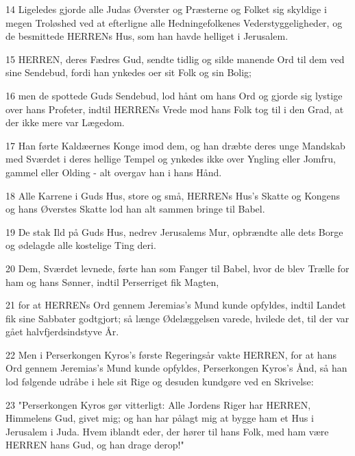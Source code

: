 \par 14 Ligeledes gjorde alle Judas Øverster og Præsterne og Folket sig skyldige i megen Troløshed ved at efterligne alle Hedningefolkenes Vederstyggeligheder, og de besmittede HERRENs Hus, som han havde helliget i Jerusalem.
\par 15 HERREN, deres Fædres Gud, sendte tidlig og silde manende Ord til dem ved sine Sendebud, fordi han ynkedes oer sit Folk og sin Bolig;
\par 16 men de spottede Guds Sendebud, lod hånt om hans Ord og gjorde sig lystige over hans Profeter, indtil HERRENs Vrede mod hans Folk tog til i den Grad, at der ikke mere var Lægedom.
\par 17 Han førte Kaldæernes Konge imod dem, og han dræbte deres unge Mandskab med Sværdet i deres hellige Tempel og ynkedes ikke over Yngling eller Jomfru, gammel eller Olding - alt overgav han i hans Hånd.
\par 18 Alle Karrene i Guds Hus, store og små, HERRENs Hus's Skatte og Kongens og hans Øverstes Skatte lod han alt sammen bringe til Babel.
\par 19 De stak Ild på Guds Hus, nedrev Jerusalems Mur, opbrændte alle dets Borge og ødelagde alle kostelige Ting deri.
\par 20 Dem, Sværdet levnede, førte han som Fanger til Babel, hvor de blev Trælle for ham og hans Sønner, indtil Perserriget fik Magten,
\par 21 for at HERRENs Ord gennem Jeremias's Mund kunde opfyldes, indtil Landet fik sine Sabbater godtgjort; så længe Ødelæggelsen varede, hvilede det, til der var gået halvfjerdsindstyve År.
\par 22 Men i Perserkongen Kyros's første Regeringsår vakte HERREN, for at hans Ord gennem Jeremias's Mund kunde opfyldes, Perserkongen Kyros's Ånd, så han lod følgende udråbe i hele sit Rige og desuden kundgøre ved en Skrivelse:
\par 23 "Perserkongen Kyros gør vitterligt: Alle Jordens Riger har HERREN, Himmelens Gud, givet mig; og han har pålagt mig at bygge ham et Hus i Jerusalem i Juda. Hvem iblandt eder, der hører til hans Folk, med ham være HERREN hans Gud, og han drage derop!"


